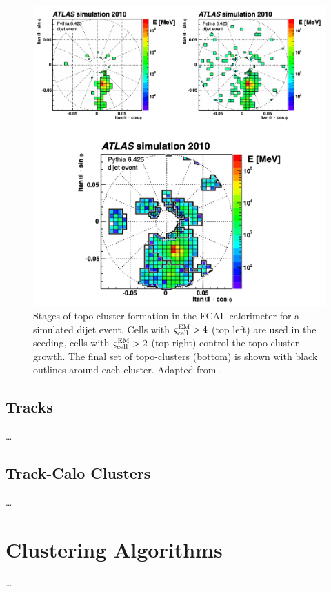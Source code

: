 \begin{figure}
	\centering
	\includegraphics[width=\textwidth]{lctopo_formation}
	\caption{
	Stages of topo-cluster formation in the FCAL calorimeter for a simulated dijet event.
	Cells with $\varsigma^{\mathrm{EM}}_{\mathrm{cell}} > 4$ (top left) are used in the seeding, cells with $\varsigma^{\mathrm{EM}}_{\mathrm{cell}} > 2$ (top right) control the topo-cluster growth.
	The final set of topo-clusters (bottom) is shown with black outlines around each cluster.
	Adapted from \cite{Aad:2016upy}.
	}
	\label{fig:lctopo_formation}
\end{figure}

\subsection{Tracks}
\cite{ATLAS-CONF-2016-035}

\dots

\subsection{Track-Calo Clusters}
\cite{ATL-PHYS-PUB-2017-015}
\dots

\section{Clustering Algorithms}
\dots

